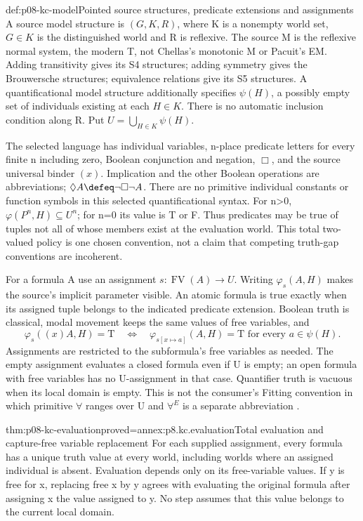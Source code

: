 \begin{hbdefinition}{def:p08-kc-model}{Pointed source structures, predicate extensions and assignments}
A source model structure is \((G,K,R)\), where K is a nonempty world
set, \(G\in K\) is the distinguished world and R is reflexive.
The source M is the reflexive normal system, the modern T, not Chellas's
monotonic M or Pacuit's EM. Adding transitivity gives its S4 structures;
adding symmetry gives the Brouwersche structures; equivalence relations
give its S5 structures. A quantificational model structure additionally
specifies \(\psi(H)\), a possibly empty set of individuals existing at
each \(H\in K\). There is no automatic inclusion condition along R.
Put \(U=\bigcup_{H\in K}\psi(H)\).

The selected language has individual variables, n-place predicate
letters for every finite n including zero, Boolean conjunction and
negation, \(\Box\), and the source universal binder \((x)\).
Implication and the other Boolean operations are abbreviations;
\(\Diamond A\defeq\neg\Box\neg A\).
There are no primitive individual constants or function symbols in
this selected quantificational syntax.
For n>0, \(\varphi(P^n,H)\subseteq U^n\); for n=0 its value
is T or F. Thus predicates may be true of tuples not all of whose
members exist at the evaluation world. This total two-valued policy
is one chosen convention, not a claim that competing truth-gap
conventions are incoherent.

For a formula A use an assignment \(s:\operatorname{FV}(A)\to U\).
Writing \(\varphi_s(A,H)\) makes the source's implicit parameter visible.
An atomic formula is true exactly when its assigned tuple belongs
to the indicated predicate extension. Boolean truth is classical,
modal movement keeps the same values of free variables, and
\[
 \varphi_s((x)A,H)=\mathrm T
 \quad\Longleftrightarrow\quad
 \varphi_{s[x\mapsto a]}(A,H)=\mathrm T
       \text{ for every }a\in\psi(H).
\]
Assignments are restricted to the subformula's free variables as needed.
The empty assignment evaluates a closed formula even if U is empty;
an open formula with free variables has no U-assignment in that case.
Quantifier truth is vacuous when its local domain is empty. This is
not the consumer's Fitting convention in which primitive \(\forall\)
ranges over U and \(\forall^E\) is a separate abbreviation
\cite[pp.~64--67]{Kripke1971ConsiderationsReprint}.
\end{hbdefinition}

\begin{hblemma}{thm:p08-kc-evaluation}{proved=annex:p8.kc.evaluation}{Total evaluation and capture-free variable replacement}
For each supplied assignment, every formula has a unique truth value
at every world, including worlds where an assigned individual is absent.
Evaluation depends only on its free-variable values.
If y is free for x, replacing free x by y agrees with evaluating the
original formula after assigning x the value assigned to y.
No step assumes that this value belongs to the current local domain.
\end{hblemma}

